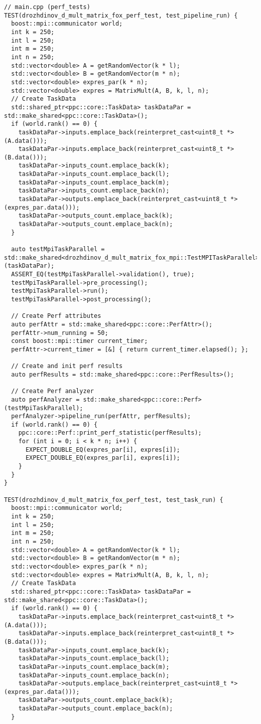 \documentclass{report}
\begin{document}
\begin{lstlisting}
// main.cpp (perf_tests)
TEST(drozhdinov_d_mult_matrix_fox_perf_test, test_pipeline_run) {
  boost::mpi::communicator world;
  int k = 250;
  int l = 250;
  int m = 250;
  int n = 250;
  std::vector<double> A = getRandomVector(k * l);
  std::vector<double> B = getRandomVector(m * n);
  std::vector<double> expres_par(k * n);
  std::vector<double> expres = MatrixMult(A, B, k, l, n);
  // Create TaskData
  std::shared_ptr<ppc::core::TaskData> taskDataPar = std::make_shared<ppc::core::TaskData>();
  if (world.rank() == 0) {
    taskDataPar->inputs.emplace_back(reinterpret_cast<uint8_t *>(A.data()));
    taskDataPar->inputs.emplace_back(reinterpret_cast<uint8_t *>(B.data()));
    taskDataPar->inputs_count.emplace_back(k);
    taskDataPar->inputs_count.emplace_back(l);
    taskDataPar->inputs_count.emplace_back(m);
    taskDataPar->inputs_count.emplace_back(n);
    taskDataPar->outputs.emplace_back(reinterpret_cast<uint8_t *>(expres_par.data()));
    taskDataPar->outputs_count.emplace_back(k);
    taskDataPar->outputs_count.emplace_back(n);
  }

  auto testMpiTaskParallel = std::make_shared<drozhdinov_d_mult_matrix_fox_mpi::TestMPITaskParallel>(taskDataPar);
  ASSERT_EQ(testMpiTaskParallel->validation(), true);
  testMpiTaskParallel->pre_processing();
  testMpiTaskParallel->run();
  testMpiTaskParallel->post_processing();

  // Create Perf attributes
  auto perfAttr = std::make_shared<ppc::core::PerfAttr>();
  perfAttr->num_running = 50;
  const boost::mpi::timer current_timer;
  perfAttr->current_timer = [&] { return current_timer.elapsed(); };

  // Create and init perf results
  auto perfResults = std::make_shared<ppc::core::PerfResults>();

  // Create Perf analyzer
  auto perfAnalyzer = std::make_shared<ppc::core::Perf>(testMpiTaskParallel);
  perfAnalyzer->pipeline_run(perfAttr, perfResults);
  if (world.rank() == 0) {
    ppc::core::Perf::print_perf_statistic(perfResults);
    for (int i = 0; i < k * n; i++) {
      EXPECT_DOUBLE_EQ(expres_par[i], expres[i]);
      EXPECT_DOUBLE_EQ(expres_par[i], expres[i]);
    }
  }
}

TEST(drozhdinov_d_mult_matrix_fox_perf_test, test_task_run) {
  boost::mpi::communicator world;
  int k = 250;
  int l = 250;
  int m = 250;
  int n = 250;
  std::vector<double> A = getRandomVector(k * l);
  std::vector<double> B = getRandomVector(m * n);
  std::vector<double> expres_par(k * n);
  std::vector<double> expres = MatrixMult(A, B, k, l, n);
  // Create TaskData
  std::shared_ptr<ppc::core::TaskData> taskDataPar = std::make_shared<ppc::core::TaskData>();
  if (world.rank() == 0) {
    taskDataPar->inputs.emplace_back(reinterpret_cast<uint8_t *>(A.data()));
    taskDataPar->inputs.emplace_back(reinterpret_cast<uint8_t *>(B.data()));
    taskDataPar->inputs_count.emplace_back(k);
    taskDataPar->inputs_count.emplace_back(l);
    taskDataPar->inputs_count.emplace_back(m);
    taskDataPar->inputs_count.emplace_back(n);
    taskDataPar->outputs.emplace_back(reinterpret_cast<uint8_t *>(expres_par.data()));
    taskDataPar->outputs_count.emplace_back(k);
    taskDataPar->outputs_count.emplace_back(n);
  }


\end{lstlisting}
\end{document}
